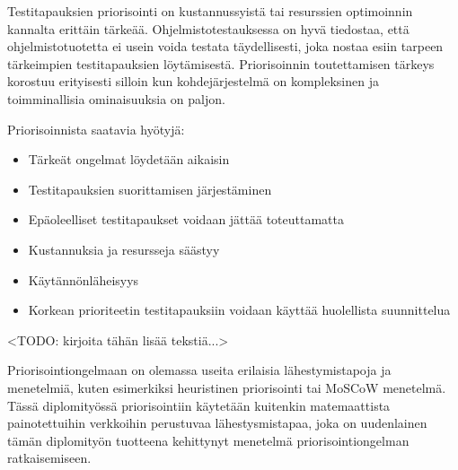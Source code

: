   Testitapauksien priorisointi on kustannussyistä tai resurssien optimoinnin kannalta erittäin tärkeää.
  Ohjelmistotestauksessa on hyvä tiedostaa, että ohjelmistotuotetta ei usein voida testata täydellisesti, joka nostaa esiin tarpeen tärkeimpien testitapauksien löytämisestä.
  Priorisoinnin toutettamisen tärkeys korostuu erityisesti silloin kun kohdejärjestelmä on kompleksinen ja toimminallisia ominaisuuksia on paljon.

  Priorisoinnista saatavia hyötyjä:
  \begin{itemize}
    \item Tärkeät ongelmat löydetään aikaisin
    \item Testitapauksien suorittamisen järjestäminen
    \item Epäoleelliset testitapaukset voidaan jättää toteuttamatta
    \item Kustannuksia ja resursseja säästyy
    \item Käytännönläheisyys
    \item Korkean prioriteetin testitapauksiin voidaan käyttää huolellista suunnittelua
  \end{itemize}

  <TODO: kirjoita tähän lisää tekstiä...>

  Priorisointiongelmaan on olemassa useita erilaisia lähestymistapoja ja menetelmiä, kuten esimerkiksi heuristinen priorisointi tai MoSCoW menetelmä.
  Tässä diplomityössä priorisointiin käytetään kuitenkin matemaattista painotettuihin verkkoihin perustuvaa lähestysmistapaa, joka on uudenlainen tämän diplomityön tuotteena kehittynyt menetelmä priorisointiongelman ratkaisemiseen.
